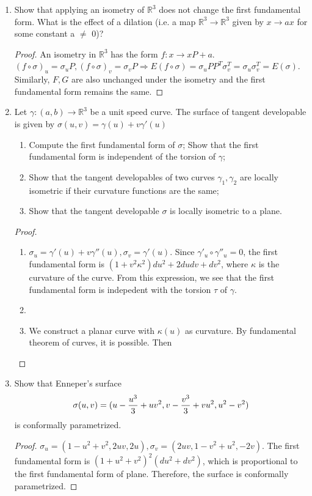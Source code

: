 \documentclass{article}
\begin{document}
\courseheader
{}
\begin{enumerate}
\item Show that applying an isometry of $\mathbb{R}^3$ does not change the first fundamental form. 
What is the effect of a dilation (i.e. a map $\mathbb{R}^3 \to \mathbb{R}^3$ given by $x\to ax$
for some constant a $\neq$ 0)?
\begin{proof}
An isometry in $\mathbb{R}^3$ has the form $f:x\to xP+a$. $(f\circ \sigma)_u =\sigma_u P,(f\circ \sigma)_v =\sigma_v P \Rightarrow E(f\circ\sigma) = \sigma_u PP^T\sigma_v^T =\sigma_u \sigma_v^T=E(\sigma)$. Similarly, $F,G$ are also unchanged under the isometry and the first fundamental form remains the same.
\end{proof}
\item Let $\gamma:(a,b) \to \mathbb{R}^3$ be a unit speed curve. The surface of tangent developable is given by
$\sigma(u,v) = \gamma(u)+v\gamma'(u)$
\begin{enumerate}[label=(\arabic*)]
\item Compute the first fundamental form of $\sigma$; Show that the first fundamental form is independent of the torsion of $\gamma$;
\item Show that the tangent developables of two curves $\gamma_1,\gamma_2$ are locally isometric if their curvature functions are the same;
\item Show that the tangent developable $\sigma$ is locally isometric to a plane.
\end{enumerate}
\begin{proof}\mbox{}
\begin{enumerate}[label=(\arabic*)]
\item $\sigma_u = \gamma'(u)+v\gamma''(u),\sigma_v = \gamma'(u)$. Since $\gamma'_u \circ \gamma''_u =0$, the first fundamental form is $(1+v^2\kappa^2)du^2+2dudv+dv^2$, where $\kappa$ is the curvature of the curve. From this expression, we see that the first fundamental form is indepedent with the torsion $\tau$ of $\gamma$. 
\item 
\item We construct a planar curve with $\kappa(u)$ as curvature. By fundamental theorem of curves, it is possible. Then 
\end{enumerate}
\end{proof}
\item Show that Enneper's surface 
\begin{equation}
\sigma(u,v)=(u-{u^3\over 3}+uv^2, v-{v^3 \over 3}+vu^2,u^2-v^2)
\end{equation}
is conformally parametrized.
\begin{proof}
$\sigma_u = (1- u^2+v^2,2uv,2u), \sigma_v = (2uv,1-v^2+u^2,-2v)$.
The first fundamental form is $(1+u^2+v^2)^2 (du^2+dv^2)$, which is proportional to the first fundamental form of plane. Therefore, the surface is conformally parametrized.
\end{proof}
\end{enumerate}
\end{document}
